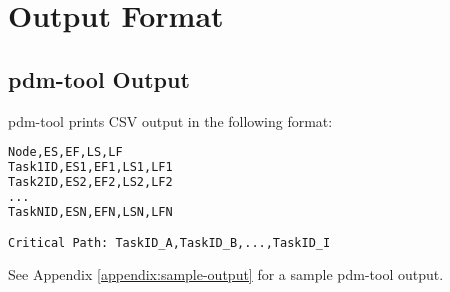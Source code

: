 \chapter{Output Format}

\section{pdm-tool Output}

pdm-tool prints CSV output in the following format:

\begin{lstlisting}[language=python,frame=single,showstringspaces=false]
Node,ES,EF,LS,LF
Task1ID,ES1,EF1,LS1,LF1
Task2ID,ES2,EF2,LS2,LF2
...
TaskNID,ESN,EFN,LSN,LFN

Critical Path: TaskID_A,TaskID_B,...,TaskID_I
\end{lstlisting}

See Appendix \ref{appendix:sample-output} for a sample pdm-tool output.
